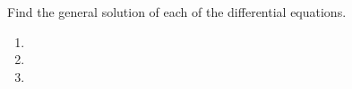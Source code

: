 Find the general solution of each of the differential equations.
\begin{enumerate}[label=(\alph*)]
    \item \vspace{1cm}
    \item \vspace{1.5cm}
    \item 
\end{enumerate}